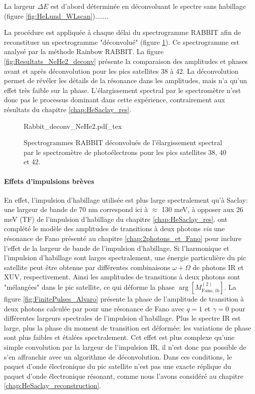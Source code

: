 La largeur $\Delta E$ est d'abord déterminée en déconvoluant le spectre sans habillage (figure \ref{fig:HeLund_WLscan}).......

La procédure est appliquée à chaque délai du spectrogramme RABBIT afin de reconstituer un spectrogramme "déconvolué" (figure \ref{fig:Rabbit_HeLund_2s2p_deconv}). Ce spectrogramme est analysé par la méthode Rainbow RABBIT. La figure \ref{fig:Resultats_NeHe2_deconv} présente la comparaison des amplitudes et phases avant et après déconvolution pour les pics satellites 38 à 42. La déconvolution permet de révéler les détails de la résonance dans les amplitudes, mais n'a qu'un effet très faible sur la phase. L'élargissement spectral par le spectromètre n'est donc pas le processus dominant dans cette expérience, contrairement aux résultats du chapitre \ref{chap:HeSaclay_res}. 

\begin{figure} [ht]
\centering
\def\svgwidth{\textwidth}
{Rabbit_deconv_NeHe2.pdf_tex}
\caption{Spectrogrammes RABBIT déconvolués de l'élargissement spectral par le spectromètre de photoélectrons pour les pics satellites 38, 40 et 42.}
\label{fig:Rabbit_HeLund_2s2p_deconv}
\end{figure}

\paragraph*{Effets d'impulsions brèves} En effet, l'impulsion d'habillage utilisée est plus large spectralement qu'à Saclay: une largeur de bande de 70 nm correspond ici à $\approx$ 130 meV, à opposer aux 26 meV (TF) de l'impulsion d'habillage du chapitre \ref{chap:HeSaclay_res}.   ont complété le modèle des amplitudes de transitions à deux photons \textit{via} une résonance de Fano présenté au chapitre \ref{chap:2photons_et_Fano} pour inclure l'effet de la largeur de bande de l'impulsion d'habillage. Si l'harmonique et l'impulsion d'habillage sont larges spectralement, une énergie particulière du pic satellite peut être obtenue par différentes combinaisons $\omega + \Omega$ de photons IR et XUV, respectivement. Ainsi les amplitudes de transitions à deux photons sont "mélangées" dans le pic satellite, ce qui déforme la phase $\arg[M^{(2)}_{\text{Fano, ib}}]$. La figure \ref{fig:FinitePulses_Alvaro} présente la phase de l'amplitude de transition à deux photons calculée par  pour une résonance de Fano avec $q = 1$ et $\gamma = 0$ pour différentes largeurs spectrales de l'impulsion d'habillage. Plus le spectre IR est large, plus la phase du moment de transition est déformée: les variations de phase sont plus faibles et étalées spectralement. Cet effet est plus complexe qu'une simple convolution par la largeur de l'impulsion IR, il n'est donc pas possible de s'en affranchir avec un algorithme de déconvolution. Dans ces conditions, le paquet d'onde électronique du pic satellite n'est pas une exacte réplique du paquet d'onde électronique résonant, comme nous l'avons considéré au chapitre \ref{chap:HeSaclay_reconstruction}. %

